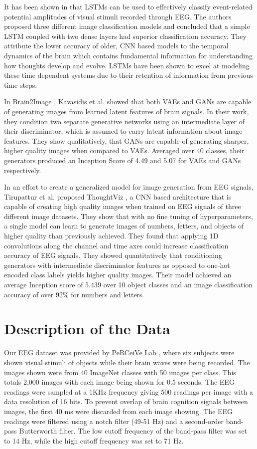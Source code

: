 \documentclass[sigplan,screen]{acmart}
\begin{document}
It has been shown in \cite{spampinato2019deep} that LSTMs can be used to effectively classify event-related potential amplitudes of visual stimuli recorded through EEG. The authors proposed three different image classification models and concluded that a simple LSTM coupled with two dense layers had superior classification accuracy. They attribute the lower accuracy of older, CNN based models to the temporal dynamics of the brain which contains fundamental information for understanding how thoughts develop and evolve. LSTMs have been shown to excel at modeling these time dependent systems due to their retention of information from previous time steps.

In Brain2Image \cite{10.1145/3123266.3127907}, Kavasidis et al. showed that both VAEs and GANs are capable of generating images from learned latent features of brain signals. In their work, they condition two separate generative networks using an intermediate layer of their discriminator, which is assumed to carry latent information about image features. They show qualitatively, that GANs are capable of generating sharper, higher quality images when compared to VAEs. Averaged over 40 classes, their generators produced an Inception Score of 4.49 and 5.07 for VAEs and GANs respectively. 

In an effort to create a generalized model for image generation from EEG signals, Tirupattur et al. proposed ThoughtViz \cite{10.1145/3240508.3240641}, a CNN based architecture that is capable of creating high quality images when trained on EEG signals of three different image datasets. They show that with no fine tuning of hyperparameters, a single model can learn to generate images of numbers, letters, and objects of higher quality than previously achieved. They found that applying 1D convolutions along the channel and time axes could increase classification accuracy of EEG signals. They showed quantitatively that conditioning generators with intermediate discriminator features as opposed to one-hot encoded class labels yields higher quality images. Their model achieved an average Inception score of 5.439 over 10 object classes and an image classification accuracy of over 92\% for numbers and letters.  


\section{Description of the Data}
Our EEG dataset was provided by PeRCeiVe Lab \cite{10.1145/3240508.3240641, 9097411}, where six subjects were shown visual stimuli of objects while their brain waves were being recorded. The images shown were from 40 ImageNet classes with 50 images per class. This totals 2,000 images with each image being shown for 0.5 seconds. The EEG readings were sampled at a 1KHz frequency giving 500 readings per image with a data resolution of 16 bits. To prevent overlap of brain cognition signals between images, the first 40 ms were discarded from each image showing. The EEG readings were filtered using a notch filter (49-51 Hz) and a second-order band-pass Butterworth filter. The low cutoff frequency of the band-pass filter was set to 14 Hz, while the high cutoff frequency was set to 71 Hz. 
\end{document}
